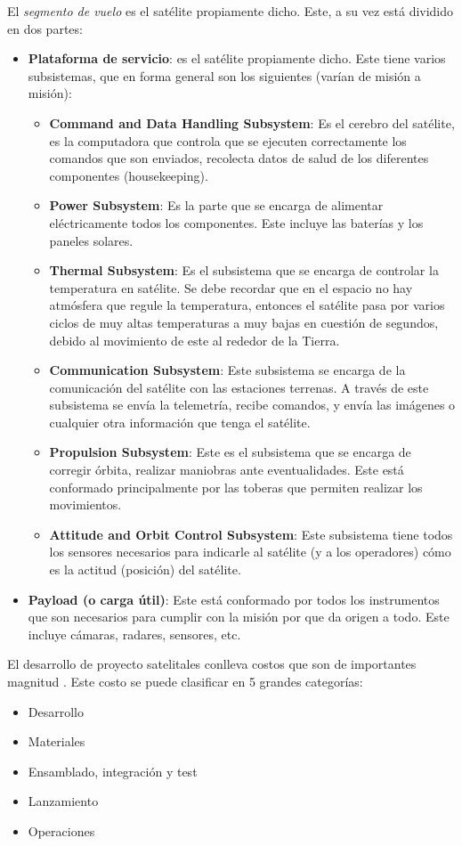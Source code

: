 \documentclass[12pt]{article}
\begin{document}
El \textit{segmento de vuelo} es el satélite propiamente dicho. Este, a su vez está dividido en dos partes:
\begin{itemize}
	\item \textbf{Plataforma de servicio}: es el satélite propiamente dicho. Este tiene varios subsistemas, que en forma general son los siguientes (varían de misión a misión):
	\begin{itemize}
		\item \textbf{Command and Data Handling Subsystem}: Es el cerebro del satélite, es la computadora que controla que se ejecuten correctamente los comandos que son enviados, recolecta datos de salud de los diferentes componentes (housekeeping). 
		\item \textbf{Power Subsystem}: Es la parte que se encarga de alimentar eléctricamente todos los componentes. Este incluye las baterías y los paneles solares.
		\item \textbf{Thermal Subsystem}: Es el subsistema que se encarga de controlar la temperatura en satélite. Se debe recordar que en el espacio no hay atmósfera que regule la temperatura, entonces el satélite pasa por varios ciclos de muy altas temperaturas a muy bajas en cuestión de segundos, debido al movimiento de este al rededor de la Tierra. 
		\item \textbf{Communication Subsystem}: Este subsistema se encarga de la comunicación del satélite con las estaciones terrenas. A través de este subsistema se envía la telemetría, recibe comandos, y envía las imágenes o cualquier otra información que tenga el satélite. 
		\item \textbf{Propulsion Subsystem}: Este es el subsistema que se encarga de corregir órbita, realizar maniobras ante eventualidades. Este está conformado principalmente por las toberas que permiten realizar los movimientos. 
		\item \textbf{Attitude and Orbit Control Subsystem}: Este subsistema tiene todos los sensores necesarios para indicarle al satélite (y a los operadores) cómo es la actitud (posición) del satélite.
	\end{itemize}

	\item \textbf{Payload (o carga útil)}: Este está conformado por todos los instrumentos que son necesarios para cumplir con la misión por que da origen a todo. Este incluye cámaras, radares, sensores, etc. 
\end{itemize}

El desarrollo de proyecto satelitales conlleva costos que son de importantes magnitud \cite{Cate-Emma}. Este costo se puede clasificar en 5 grandes categorías:
\begin{itemize}
	\item Desarrollo
	\item Materiales
	\item Ensamblado, integración y test
	\item Lanzamiento
	\item Operaciones
\end{itemize}
\end{document}
